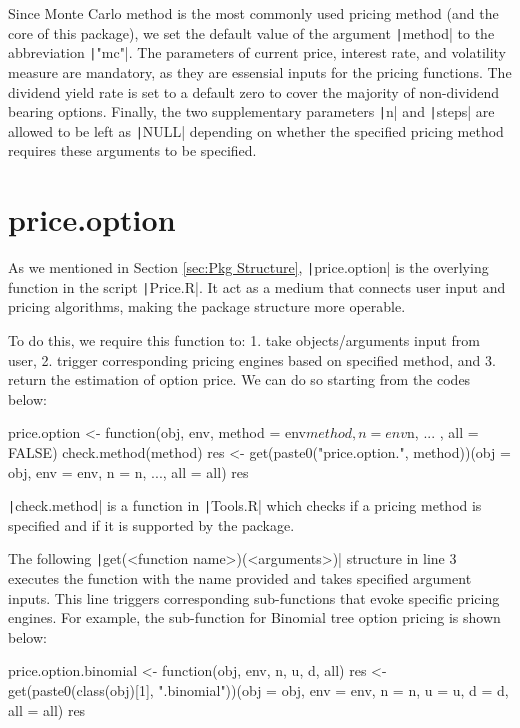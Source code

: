 Since Monte Carlo method is the most commonly used pricing method (and the core of this package), we set the default value of the argument \texttt|method| to the abbreviation \texttt|"mc"|. The parameters of current price, interest rate, and volatility measure are mandatory, as they are essensial inputs for the pricing functions. The dividend yield rate is set to a default zero to cover the majority of non-dividend bearing options. Finally, the two supplementary parameters \texttt|n| and \texttt|steps| are allowed to be left as \texttt|NULL| depending on whether the specified pricing method requires these arguments to be specified.

\section{price.option}

As we mentioned in Section \ref{sec:Pkg Structure}, \texttt|price.option| is the overlying function in the script \texttt|Price.R|. It act as a medium that connects user input and pricing algorithms, making the package structure more operable.

To do this, we require this function to: 1. take objects/arguments input from user, 2. trigger corresponding pricing engines based on specified method, and 3. return the estimation of option price. We can do so starting from the codes below:

\begin{Rminted}
price.option <- function(obj, env, method = env$method, n = env$n, ... , all = FALSE) {
    check.method(method)
    res <- get(paste0("price.option.", method))(obj = obj, env = env, n = n, ..., all = all)
    res
}
\end{Rminted}

\texttt|check.method| is a function in \texttt|Tools.R| which checks if a pricing method is specified and if it is supported by the package.

The following \texttt|get(<function name>)(<arguments>)| structure in line 3 executes the function with the name provided and takes specified argument inputs. This line triggers corresponding sub-functions that evoke specific pricing engines. For example, the sub-function for Binomial tree option pricing is shown below:

\begin{Rminted}
price.option.binomial <- function(obj, env, n, u, d, all) {
    res <- get(paste0(class(obj)[1], ".binomial"))(obj = obj, env = env, n = n, u = u, d = d, all = all)
    res
}
\end{Rminted}

